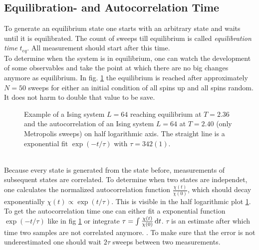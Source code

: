 \subsection{Equilibration- and Autocorrelation Time}
\label{ssec:eqtime}
    To generate an equilibrium state one starts with an arbitrary state
    and waits until it is equilibrated. The count of sweeps till
    equilibrium is called \emph{equilibration time} \(t_{eq}\).
    All measurement should start after this time.\\
    To determine when the system is in equilibrium, one can watch the
    development of some observables and take the point at which there
    are no big changes anymore as equilibrium. In fig.
    \ref{fig:equiandauto}
    the equilibrium is reached after approximately \(N=50\) sweeps for
    either an initial condition of all spins up and all spins random. It
    does not harm to double that value to be save.
    \begin{figure}[htbp]
        \centering
        \caption[Examples for equilibration and autocorrelation]
        {
             Example of a Ising system
                \(L=64\) reaching equilibrium at \(T=2.36\) and
             the autocorrelation of an
                Ising system \(L=64\) at \(T=2.40\) (only Metropolis
                sweeps) on half logarithmic axis.
                The straight line is a exponential fit \(\exp(-t/\tau)\)
                with \(\tau = 342(1)\).
        }
        \label{fig:equiandauto}
    \end{figure}\\
    Because every state is generated from the state before, measurements
    of subsequent states are correlated. To determine when two states
    are independet, one calculates the normalized autocorrelation function
    \(\frac{\chi(t)}{\chi(0)}\), which should decay exponentially
    \(\chi(t) \propto \exp(t/\tau)\). This is visible in the half
    logarithmic plot \ref{fig:equiandauto}.
    To get the autocorrelation time one can either fit a exponential
    function \(\exp(-t/\tau)\) like in fig \ref{fig:equiandauto}
    or integrate \(\tau = \int \frac{\chi(t)}{\chi(0)} \,\mathrm{d} t\).
    \(\tau\) is an estimate after which time two samples are not
    correlated anymore. \cite[S. ??]{NewmanBarkema1999} \cite[S. 150f]{Katzgraber2011}.
    To make sure that the error is not underestimated one should wait
    \(2\tau\) sweeps between two measurements.

